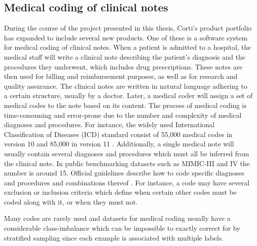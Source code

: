 \subsection{Medical coding of clinical notes}
%
During the course of the project presented in this thesis, Corti's product portfolio has expanded to include several new products. 
One of these is a software system for medical coding of clinical notes. 
When a patient is admitted to a hospital, the medical staff will write a clinical note describing the patient's diagnosis and the procedures they underwent, which includes drug prescriptions. 
These notes are then used for billing and reimbursement purposes, as well as for research and quality assurance. 
The clinical notes are written in natural language adhering to a certain structure, usually by a doctor. Later, a medical coder will assign a set of medical codes to the note based on its content. 
The process of medical coding is time-consuming and error-prone due to the number and complexity of medical diagnoses and procedures. For instance, the widely used International Classification of Diseases (ICD) standard consist of 55,000 medical codes in version 10 and 85,000 in version 11 \cite{worldhealthorganisationwho_international_2023}. Additionally, a single medical note will usually contain several diagnoses and procedures which must all be inferred from the clinical note. In public benchmarking datasets such as MIMIC-III and IV the number is around 15. Official guidelines describe how to code specific diagnoses and procedures and combinations thereof \cite{centersformedicaremedicaidservicesus_icd10cm_2023}. 
For instance, a code may have several exclusion or inclusion criteria which define when certain other codes must be coded along with it, or when they must not. 


Many codes are rarely used and datasets for medical coding usually have a considerable class-imbalance which can be impossible to exactly correct for by stratified sampling since each example is associated with multiple labels. 

